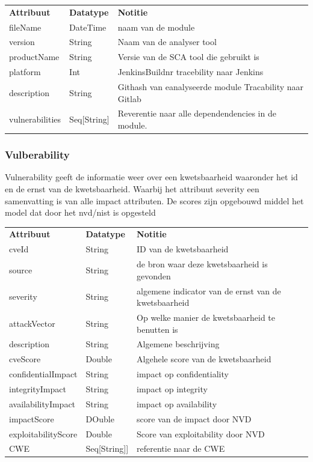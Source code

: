 \begin{tabular}{lll}
    \textbf{Attribuut} & \textbf{Datatype} & \textbf{Notitie}\\
    fileName & DateTime & naam van de module\\
    version & String & Naam van de analyser tool\\
    productName & String & Versie van de SCA tool die gebruikt is\\
    platform & Int & JenkinsBuildnr tracebility naar Jenkins\\
    description & String & Githash van  eanalyseerde module Tracability naar Gitlab\\
    vulnerabilities & Seq[String] & Reverentie naar alle dependendencies in de module.\\
\end{tabular}

\subsubsection{Vulberability}\label{subsubsec:vulberability}
Vulnerability geeft de informatie weer over een kwetsbaarheid waaronder het id en de ernst van de kwetsbaarheid. Waarbij het attribuut severity een samenvatting is van alle impact attributen.  De scores zijn opgebouwd middel het model dat door het nvd/nist is opgesteld

\begin{tabular}{lll}
    \textbf{Attribuut} & \textbf{Datatype} & \textbf{Notitie}\\

    cveId & String & ID van de kwetsbaarheid\\
    source & String & de bron waar deze kwetsbaarheid is gevonden\\
    severity & String & algemene indicator van de ernst van de kwetsbaarheid \\
    attackVector & String & Op welke manier de kwetsbaarheid te benutten is\\
    description & String & Algemene beschrijving\\
    cveScore & Double & Algehele score van de kwetsbaarheid\\
    confidentialImpact & String & impact op confidentiality\\
    integrityImpact & String & impact op integrity \\
    availabilityImpact & String &  impact op availability  \\
    impactScore & DOuble & score van de impact door NVD  \\
    exploitabilityScore & Double & Score van exploitability door NVD  \\
    CWE & Seq[String]] & referentie naar de CWE \\
\end{tabular}

